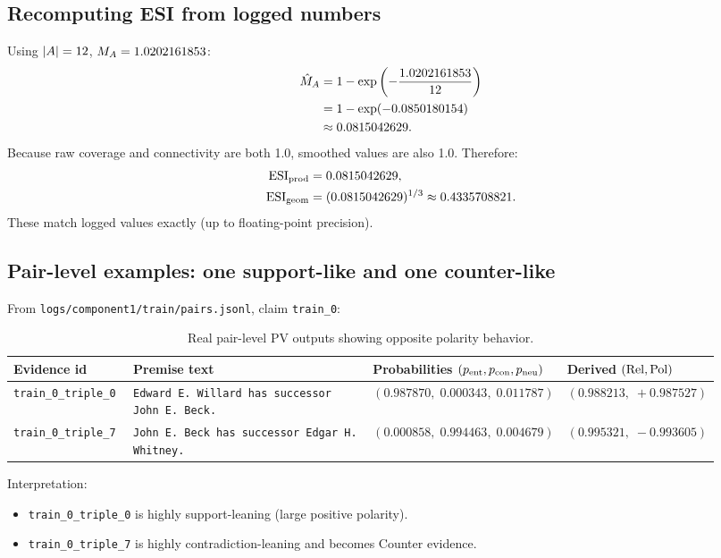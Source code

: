 \subsection{Recomputing ESI from logged numbers}
Using $|A|=12$, $M_{A}=1.0202161853$:
\begin{align}
\hat{M}_{A}
&= 1 - \exp\left(-\frac{1.0202161853}{12}\right) \\
&= 1 - \exp(-0.0850180154) \\
&\approx 0.0815042629.
\end{align}
Because raw coverage and connectivity are both 1.0, smoothed values are also 1.0.
Therefore:
\begin{align}
\operatorname{ESI}_{\mathrm{prod}} &= 0.0815042629, \\
\operatorname{ESI}_{\mathrm{geom}} &= (0.0815042629)^{1/3} \approx 0.4335708821.
\end{align}
These match logged values exactly (up to floating-point precision).

\subsection{Pair-level examples: one support-like and one counter-like}
From \texttt{logs/component1/train/pairs.jsonl}, claim \texttt{train\_0}:

\begin{table}[H]
\centering
\begin{tabular}{@{}p{0.17\linewidth}p{0.36\linewidth}p{0.19\linewidth}p{0.20\linewidth}@{}}
\toprule
Evidence id & Premise text & Probabilities $(p_{\mathrm{ent}},p_{\mathrm{con}},p_{\mathrm{neu}})$ & Derived $(\operatorname{Rel},\operatorname{Pol})$ \\
\midrule
\texttt{train\_0\_triple\_0}
& \texttt{Edward E. Willard has successor John E. Beck.}
& $(0.987870,\;0.000343,\;0.011787)$
& $(0.988213,\;+0.987527)$ \\
\texttt{train\_0\_triple\_7}
& \texttt{John E. Beck has successor Edgar H. Whitney.}
& $(0.000858,\;0.994463,\;0.004679)$
& $(0.995321,\;-0.993605)$ \\
\bottomrule
\end{tabular}
\caption{Real pair-level PV outputs showing opposite polarity behavior.}
\label{tab:c1_pair_examples}
\end{table}

Interpretation:
\begin{itemize}
\item \texttt{train\_0\_triple\_0} is highly support-leaning (large positive polarity).
\item \texttt{train\_0\_triple\_7} is highly contradiction-leaning and becomes Counter evidence.
\end{itemize}

